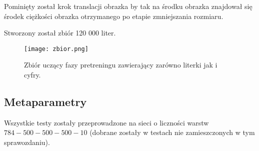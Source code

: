 \documentclass[fleqn]{scrartcl}
\begin{document}
Pominięty został krok translacji obrazka by tak na środku obrazka znajdował się środek ciężkości obrazka otrzymanego po etapie zmniejszania rozmiaru. 

Stworzony został zbiór 120 000 liter.

\begin{figure}[h!]
  \caption{Zbiór uczący fazy pretreningu zawierający zarówno literki jak i cyfry.}
  \centering
    \texttt{[image: zbior.png]}
\end{figure}



\subsection{Metaparametry}
Wszystkie testy zostały przeprowadzone na sieci o liczności warstw $784 -500-500-500- 10$ (dobrane zostały w testach nie zamieszczonych w tym sprawozdaniu).
\end{document}
